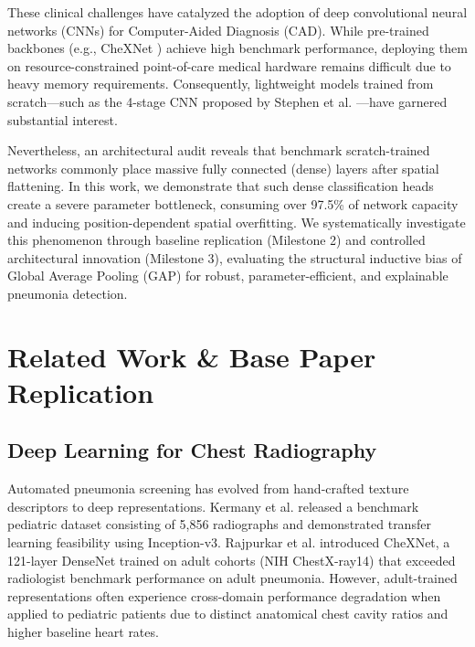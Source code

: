 \documentclass[conference]{IEEEtran}
\begin{document}
These clinical challenges have catalyzed the adoption of deep convolutional neural networks (CNNs) for Computer-Aided Diagnosis (CAD). While pre-trained backbones (e.g., CheXNet \cite{b_rajpurkar}) achieve high benchmark performance, deploying them on resource-constrained point-of-care medical hardware remains difficult due to heavy memory requirements. Consequently, lightweight models trained from scratch—such as the 4-stage CNN proposed by Stephen et al. \cite{b_stephen}—have garnered substantial interest.

Nevertheless, an architectural audit reveals that benchmark scratch-trained networks commonly place massive fully connected (dense) layers after spatial flattening. In this work, we demonstrate that such dense classification heads create a severe parameter bottleneck, consuming over 97.5\% of network capacity and inducing position-dependent spatial overfitting. We systematically investigate this phenomenon through baseline replication (Milestone 2) and controlled architectural innovation (Milestone 3), evaluating the structural inductive bias of Global Average Pooling (GAP) \cite{b_lin} for robust, parameter-efficient, and explainable pneumonia detection.

\section{Related Work \& Base Paper Replication}
\subsection{Deep Learning for Chest Radiography}
Automated pneumonia screening has evolved from hand-crafted texture descriptors to deep representations. Kermany et al. \cite{b_kermany} released a benchmark pediatric dataset consisting of 5,856 radiographs and demonstrated transfer learning feasibility using Inception-v3. Rajpurkar et al. \cite{b_rajpurkar} introduced CheXNet, a 121-layer DenseNet trained on adult cohorts (NIH ChestX-ray14) that exceeded radiologist benchmark performance on adult pneumonia. However, adult-trained representations often experience cross-domain performance degradation when applied to pediatric patients due to distinct anatomical chest cavity ratios and higher baseline heart rates.
\end{document}
